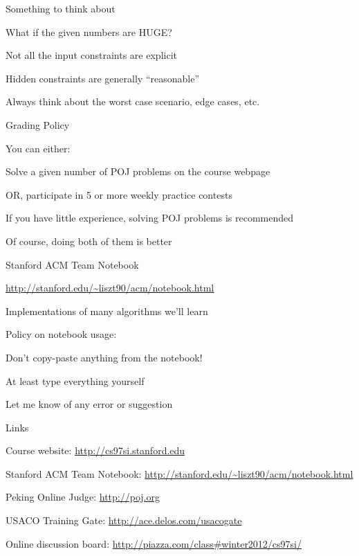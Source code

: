 \documentclass[13pt,onlymath]{beamer}
\begin{document}
\begin{frame} {Something to think about}
\BIT
\item What if the given numbers are HUGE?

\item Not all the input constraints are explicit
\BIT \item Hidden constraints are generally ``reasonable'' \EIT

\item Always think about the worst case scenario, edge cases, etc.
\EIT
\end{frame}

\begin{frame} {Grading Policy}
\BIT
\item You can either:
\BIT
\item Solve a given number of POJ problems on the course webpage
\item OR, participate in 5 or more weekly practice contests
\EIT

\item If you have little experience, solving POJ problems is recommended
\BIT
\item Of course, doing both of them is better
\EIT
\EIT
\end{frame}

\begin{frame} {Stanford ACM Team Notebook}
\BIT
\item \url{http://stanford.edu/~liszt90/acm/notebook.html}
\item Implementations of many algorithms we'll learn
\item Policy on notebook usage:
\BIT
\item Don't copy-paste anything from the notebook!
\item At least type everything yourself
\item Let me know of any error or suggestion
\EIT
\EIT
\end{frame}

\begin{frame}[fragile] {Links}
\BIT
\item Course website: \url{http://cs97si.stanford.edu}
\item Stanford ACM Team Notebook: \url{http://stanford.edu/~liszt90/acm/notebook.html}
\item Peking Online Judge: \url{http://poj.org}
\item USACO Training Gate: \url{http://ace.delos.com/usacogate}
\item Online discussion board: \url{http://piazza.com/class#winter2012/cs97si/}
\EIT
\end{frame}
\end{document}
